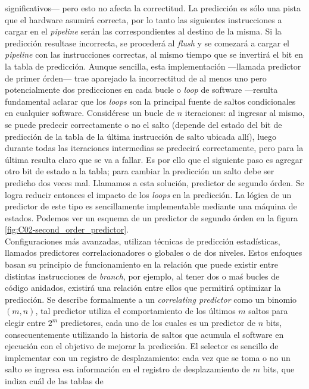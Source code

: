 significativos--- pero esto no afecta la correctitud. La predicción es sólo una 
pista que el hardware asumirá correcta, por lo tanto las siguientes 
instrucciones a cargar en el \emph{pipeline} serán las correspondientes al 
destino de la misma. Si la predicción resultase incorrecta, se procederá al 
\emph{flush} y se comezará a cargar el \emph{pipeline} con las instrucciones 
correctas, al mismo tiempo que se invertirá el bit en la tabla de predicción. 
Aunque sencilla, esta implementación ---llamada predictor de primer 
órden--- trae aparejado la incorrectitud de al menos uno pero potencialmente dos 
predicciones en cada bucle o \emph{loop} de software ---resulta fundamental 
aclarar que los \emph{loops} son la principal fuente de saltos condicionales en 
cualquier software. Considérese un bucle de $n$ iteraciones: al ingresar 
al mismo, se puede predecir correctamente o no el salto (depende del estado del 
bit de predicción de la tabla de la última instrucción de salto ubicada allí), 
luego durante todas las iteraciones intermedias se predecirá correctamente, pero 
para la última resulta claro que se va a fallar. Es por ello que el siguiente 
paso es agregar otro bit de estado a la tabla; para cambiar la predicción un 
salto debe ser predicho dos veces mal. Llamamos a esta solución, predictor de 
segundo órden. Se logra reducir entonces el impacto de los \emph{loops} en la 
predicción. La lógica de un predictor de este tipo es sencillamente 
implementable mediante una máquina de estados. Podemos ver un esquema de un 
predictor de segundo órden en la figura \ref{fig:C02-second_order_predictor}.\\
Configuraciones más avanzadas, utilizan técnicas de predicción estadísticas, 
llamados predictores correlacionadores o globales o de dos niveles. Estos 
enfoques basan su principio de funcionamiento en la relación que puede existir 
entre distintas instrucciones de \emph{branch}, por ejemplo, al tener dos o maś 
bucles de código anidados, existirá una relación entre ellos que permitirá 
optimizar la predicción. Se describe formalmente a un \emph{correlating 
predictor} como un binomio $(m,n)$, tal predictor utiliza el comportamiento de 
los últimos $m$ saltos para elegir entre $2^{m}$ predictores, cada uno de los 
cuales es un predictor de $n$ bits, consecuentemente utilizando la historia de 
saltos que acumula el software en ejecución con el objetivo de mejorar la 
predicción. El selector es sencillo de implementar con un registro de 
desplazamiento: cada vez que se toma o no un salto se ingresa esa información 
en el registro de desplazamiento de $m$ bits, que indiza cuál de las tablas de 
